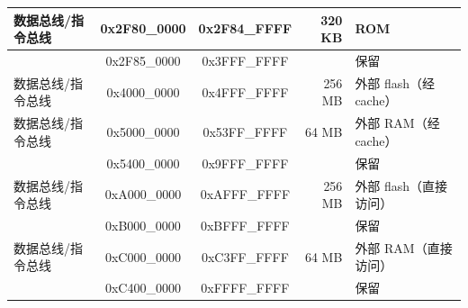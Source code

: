 \begin{ThreePartTable}
\begin{longtable}[c]{|p{3.5cm}|c|c|r|p{3.2cm}| }
        {数据总线/指令总线} & 0x2F80\_0000 & 0x2F84\_FFFF & 320 KB & ROM\tnote{*}  \\\hline
        \rowcolor{gray!25}  & 0x2F85\_0000 & 0x3FFF\_FFFF &        & 保留      \\\hline
        {数据总线/指令总线} & 0x4000\_0000 & 0x4FFF\_FFFF & 256 MB & 外部 flash（经 cache） \\\hline
        {数据总线/指令总线} & 0x5000\_0000 & 0x53FF\_FFFF & 64 MB  & 外部 RAM（经 cache） \\\hline
        \rowcolor{gray!25}  & 0x5400\_0000 & 0x9FFF\_FFFF &        & 保留      \\\hline
        {数据总线/指令总线} & 0xA000\_0000 & 0xAFFF\_FFFF & 256 MB & 外部 flash（直接访问） \\\hline
        \rowcolor{gray!25}  & 0xB000\_0000 & 0xBFFF\_FFFF &        & 保留      \\\hline        
        {数据总线/指令总线} & 0xC000\_0000 & 0xC3FF\_FFFF & 64 MB  & 外部 RAM（直接访问） \\\hline        
        \rowcolor{gray!25}  & 0xC400\_0000 & 0xFFFF\_FFFF &        & 保留      \\\hline
        
\end{longtable}
\end{ThreePartTable}


